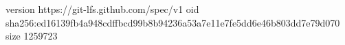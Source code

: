version https://git-lfs.github.com/spec/v1
oid sha256:ed16139fb4a948cdffbcd99b8b94236a53a7e11e7fe5dd6e46b803dd7e79d070
size 1259723
